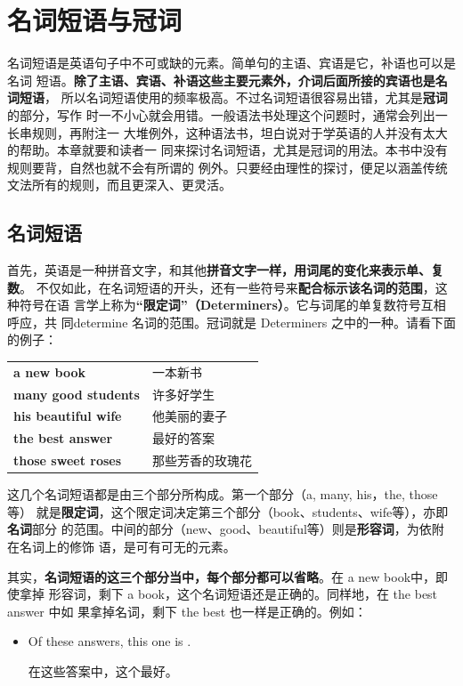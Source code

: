 \chapter{名词短语与冠词}

名词短语是英语句子中不可或缺的元素。简单句的主语、宾语是它，补语也可以是名词
短语。\textbf{除了主语、宾语、补语这些主要元素外，介词后面所接的宾语也是名词短语}，
所以名词短语使用的频率极高。不过名词短语很容易出错，尤其是\textbf{冠词}的部分，写作
时一不小心就会用错。一般语法书处理这个问题时，通常会列出一长串规则，再附注一
大堆例外，这种语法书，坦白说对于学英语的人并没有太大的帮助。本章就要和读者一
同来探讨名词短语，尤其是冠词的用法。本书中没有规则要背，自然也就不会有所谓的
例外。只要经由理性的探讨，便足以涵盖传统文法所有的规则，而且更深入、更灵活。

\section{名词短语}

首先，英语是一种拼音文字，和其他\textbf{拼音文字一样，用词尾的变化来表示单、复数}。
不仅如此，在名词短语的开头，还有一些符号来\textbf{配合标示该名词的范围}，这种符号在语
言学上称为\textbf{“限定词”（Determiners）}。它与词尾的单复数符号互相呼应，共
同determine 名词的范围。冠词就是 Determiners 之中的一种。请看下面的例子：

\begin{table}[]
  \centering
  \begin{tabular}{ll}
    \textbf{a new book}         & 一本新书     \\
    \textbf{many good  students} & 许多好学生    \\
    \textbf{his beautiful wife} & 他美丽的妻子   \\
    \textbf{the best answer}    & 最好的答案    \\
    \textbf{those sweet roses}  & 那些芳香的玫瑰花
  \end{tabular}
\end{table}

这几个名词短语都是由三个部分所构成。第一个部分（a, many, his，the, those等）
就是\textbf{限定词}，这个限定词决定第三个部分（book、students、wife等），亦即\textbf{名词}部分
的范围。中间的部分（new、good、beautiful等）则是\textbf{形容词}，为依附在名词上的修饰
语，是可有可无的元素。

其实，\textbf{名词短语的这三个部分当中，每个部分都可以省略}。在 a new book中，即使拿掉
形容词，剩下 a book，这个名词短语还是正确的。同样地，在 the best answer 中如
果拿掉名词，剩下 the best 也一样是正确的。例如：
\begin{itemize}
\item Of these answers, this one is .

  在这些答案中，这个最好。
\end{itemize}

